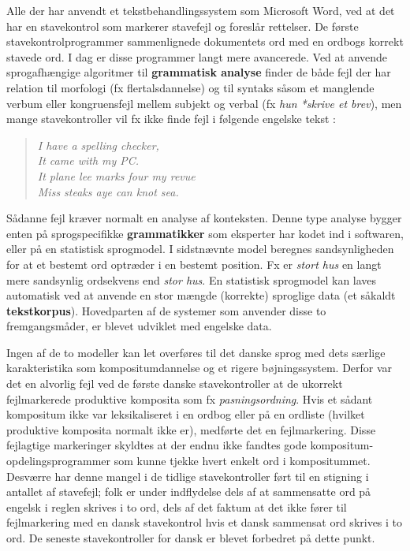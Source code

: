 \begin{multicols}{2}
 Alle der har anvendt et tekstbehandlingssystem som Microsoft Word, ved at det har en stavekontrol som markerer stavefejl og foresl\aa r rettelser. De f\o rste stavekontrolprogrammer sammenlignede dokumentets ord med en ordbogs korrekt stavede ord. I dag er disse programmer langt mere avancerede. Ved at anvende sprogafh\ae ngige algoritmer til {\bf grammatisk analyse} finder de b\aa de fejl der har relation til morfologi (fx flertalsdannelse) og til syntaks s\aa som et manglende verbum eller kongruensfejl mellem subjekt og verbal (fx {\it hun *skrive et brev}), men mange stavekontroller vil fx ikke finde fejl i f\o lgende engelske tekst \cite{zar1}:

\begin{quote}
 {\it  I have a spelling checker,\\
  It came with my PC.\\
  It plane lee marks four my revue\\
  Miss steaks aye can knot sea.}
\end{quote}

S\aa danne fejl kr\ae ver normalt en analyse af konteksten. Denne type analyse bygger enten \mbox{p\aa} sprogspecifikke {\bf grammatikker} som eksperter har kodet ind i softwaren, eller \mbox{p\aa} en statistisk sprogmodel. I sidstn\ae vnte model beregnes sandsynligheden for at et bestemt ord optr\ae der i en bestemt position. Fx er {\it stort hus}  en langt mere sandsynlig ordsekvens end {\it stor hus}. En statistisk sprogmodel kan laves automatisk ved at anvende en stor m\ae ngde (korrekte) sproglige data (et s\aa kaldt {\bf tekstkorpus}). Hovedparten af de systemer som anvender disse to fremgangsm\aa der, er blevet udviklet med engelske data. 

Ingen af de to modeller kan let overf\o res til det danske sprog med dets s\ae rlige karakteristika som kompositumdannelse og et rigere b\o jningssystem. Derfor var det en alvorlig fejl ved de f\o rste danske stavekontroller at de ukorrekt fejlmarkerede produktive komposita som fx {\it pasningsordning}. Hvis et s\aa dant kompositum ikke var leksikaliseret i en ordbog eller \mbox{p\aa} en ordliste (hvilket produktive komposita normalt ikke er), medf\o rte det en fejlmarkering. Disse fejlagtige markeringer skyldtes at der endnu ikke fandtes gode kompositum-opdelingsprogrammer som kunne tjekke hvert enkelt ord i kompositummet. Desv\ae rre har denne mangel i de tidlige stavekontroller f\o rt til en stigning i antallet af stavefejl; folk er under indflydelse dels af at sammensatte ord \mbox{p\aa} engelsk i reglen skrives i to ord, dels af det faktum at det ikke f\o rer til fejlmarkering med en dansk stavekontrol hvis et dansk sammensat ord skrives i to ord.  De seneste stavekontroller for dansk er blevet forbedret \mbox{p\aa} dette punkt.


\end{multicols}
